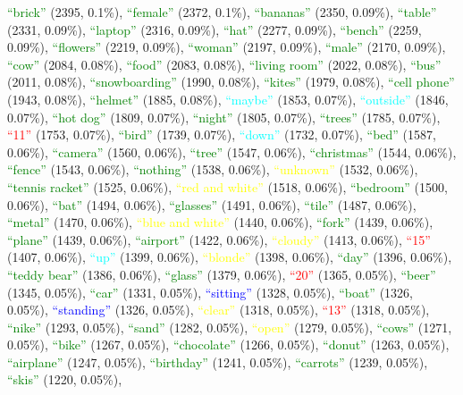 {\textcolor{green}{``brick''}} (2395, 0.1\%), {\textcolor{green}{``female''}} (2372, 0.1\%), {\textcolor{green}{``bananas''}} (2350, 0.09\%), {\textcolor{green}{``table''}} (2331, 0.09\%), {\textcolor{green}{``laptop''}} (2316, 0.09\%), {\textcolor{green}{``hat''}} (2277, 0.09\%), {\textcolor{green}{``bench''}} (2259, 0.09\%), {\textcolor{green}{``flowers''}} (2219, 0.09\%), {\textcolor{green}{``woman''}} (2197, 0.09\%), {\textcolor{green}{``male''}} (2170, 0.09\%), {\textcolor{green}{``cow''}} (2084, 0.08\%), {\textcolor{green}{``food''}} (2083, 0.08\%), {\textcolor{green}{``living room''}} (2022, 0.08\%), {\textcolor{green}{``bus''}} (2011, 0.08\%), {\textcolor{green}{``snowboarding''}} (1990, 0.08\%), {\textcolor{green}{``kites''}} (1979, 0.08\%), {\textcolor{green}{``cell phone''}} (1943, 0.08\%), {\textcolor{green}{``helmet''}} (1885, 0.08\%), {\textcolor{cyan}{``maybe''}} (1853, 0.07\%), {\textcolor{cyan}{``outside''}} (1846, 0.07\%), {\textcolor{green}{``hot dog''}} (1809, 0.07\%), {\textcolor{green}{``night''}} (1805, 0.07\%), {\textcolor{green}{``trees''}} (1785, 0.07\%), {\textcolor{red}{``11''}} (1753, 0.07\%), {\textcolor{green}{``bird''}} (1739, 0.07\%), {\textcolor{cyan}{``down''}} (1732, 0.07\%), {\textcolor{green}{``bed''}} (1587, 0.06\%), {\textcolor{green}{``camera''}} (1560, 0.06\%), {\textcolor{green}{``tree''}} (1547, 0.06\%), {\textcolor{green}{``christmas''}} (1544, 0.06\%), {\textcolor{green}{``fence''}} (1543, 0.06\%), {\textcolor{green}{``nothing''}} (1538, 0.06\%), {\textcolor{yellow}{``unknown''}} (1532, 0.06\%), {\textcolor{green}{``tennis racket''}} (1525, 0.06\%), {\textcolor{yellow}{``red and white''}} (1518, 0.06\%), {\textcolor{green}{``bedroom''}} (1500, 0.06\%), {\textcolor{green}{``bat''}} (1494, 0.06\%), {\textcolor{green}{``glasses''}} (1491, 0.06\%), {\textcolor{green}{``tile''}} (1487, 0.06\%), {\textcolor{green}{``metal''}} (1470, 0.06\%), {\textcolor{yellow}{``blue and white''}} (1440, 0.06\%), {\textcolor{green}{``fork''}} (1439, 0.06\%), {\textcolor{green}{``plane''}} (1439, 0.06\%), {\textcolor{green}{``airport''}} (1422, 0.06\%), {\textcolor{yellow}{``cloudy''}} (1413, 0.06\%), {\textcolor{red}{``15''}} (1407, 0.06\%), {\textcolor{cyan}{``up''}} (1399, 0.06\%), {\textcolor{yellow}{``blonde''}} (1398, 0.06\%), {\textcolor{green}{``day''}} (1396, 0.06\%), {\textcolor{green}{``teddy bear''}} (1386, 0.06\%), {\textcolor{green}{``glass''}} (1379, 0.06\%), {\textcolor{red}{``20''}} (1365, 0.05\%), {\textcolor{green}{``beer''}} (1345, 0.05\%), {\textcolor{green}{``car''}} (1331, 0.05\%), {\textcolor{blue}{``sitting''}} (1328, 0.05\%), {\textcolor{green}{``boat''}} (1326, 0.05\%), {\textcolor{blue}{``standing''}} (1326, 0.05\%), {\textcolor{yellow}{``clear''}} (1318, 0.05\%), {\textcolor{red}{``13''}} (1318, 0.05\%), {\textcolor{green}{``nike''}} (1293, 0.05\%), {\textcolor{green}{``sand''}} (1282, 0.05\%), {\textcolor{yellow}{``open''}} (1279, 0.05\%), {\textcolor{green}{``cows''}} (1271, 0.05\%), {\textcolor{green}{``bike''}} (1267, 0.05\%), {\textcolor{green}{``chocolate''}} (1266, 0.05\%), {\textcolor{green}{``donut''}} (1263, 0.05\%), {\textcolor{green}{``airplane''}} (1247, 0.05\%), {\textcolor{green}{``birthday''}} (1241, 0.05\%), {\textcolor{green}{``carrots''}} (1239, 0.05\%), {\textcolor{green}{``skis''}} (1220, 0.05\%), 